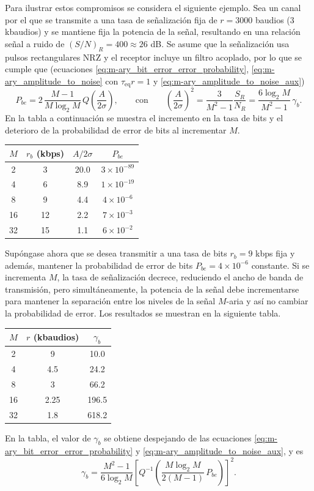 \documentclass[a4paper]{article}
\begin{document}
Para ilustrar estos compromisos se considera el siguiente ejemplo. Sea un canal por el que se transmite a una tasa de señalización fija de \(r=3000\) baudios (3 kbaudios) y se mantiene fija la potencia de la señal, resultando en una relación señal a ruido de \((S/N)_R=400\approx26\) dB. Se asume que la señalización usa pulsos rectangulares NRZ y el receptor incluye un filtro acoplado, por lo que se cumple que (ecuaciones \ref{eq:m-ary_bit_error_error_probability}, \ref{eq:m-ary_amplitude_to_noise} con \(\tau_\textrm{eq}r=1\) y \ref{eq:m-ary_amplitude_to_noise_aux})
\[
 P_{be}=2\,\frac{M-1}{M\log_2M}\,Q\left(\frac{A}{2\sigma}\right),\qquad\textrm{con}\qquad \left(\frac{A}{2\sigma}\right)^2=\frac{3}{M^2-1}\frac{S_R}{N_R}=\frac{6\log_2M}{M^2-1}\,\gamma_b.
\]
En la tabla a continuación se muestra el incremento en la tasa de bits y el deterioro de la probabilidad de error de bits al incrementar \(M\).
\begin{center}
\bgroup
\def\arraystretch{1.2}
\begin{tabular}{c c S c}\hline
\boldmath\(M\) & \boldmath\(r_b\) (kbps) & \boldmath\(A/2\sigma\) & \boldmath\(P_{be}\) \\ & 3  &  20.0 & \(3\times10^{-89}\) \\
4 & 6  &  8.9 & \(1\times10^{-19}\) \\
8 & 9  &  4.4 & \(4\times10^{-6}\) \\
16 & 12  &  2.2 & \(7\times10^{-3}\) \\
32 & 15  &  1.1 & \(6\times10^{-2}\)\\\hline
\end{tabular}
\egroup
\end{center}

Supóngase ahora que se desea transmitir a una tasa de bits \(r_b=9\) kbps fija y además, mantener la probabilidad de error de bits \(P_{be}=4\times10^{-6}\) constante. Si se incrementa \(M\), la tasa de señalización decrece, reduciendo el ancho de banda de transmisión, pero simultáneamente, la potencia de la señal debe incrementarse para mantener la separación entre los niveles de la señal \(M\)-aria y así no cambiar la probabilidad de error. Los resultados se muestran en la siguiente tabla.
\begin{center}
\bgroup
\def\arraystretch{1.2}
\begin{tabular}{c S S}\hline
\boldmath\(M\) & \boldmath\(r\) (kbaudios) & \boldmath\(\gamma_b\) \\ & 9  &  10.0  \\
4 & 4.5  &  24.2  \\
8 & 3  &  66.2  \\
16 & 2.25  &  196.5  \\
32 & 1.8  &  618.2 \\\hline
\end{tabular}
\egroup
\end{center}
En la tabla, el valor de \(\gamma_b\) se obtiene despejando de las ecuaciones \ref{eq:m-ary_bit_error_error_probability} y \ref{eq:m-ary_amplitude_to_noise_aux}, y es
\[
 \gamma_b = \frac{M^2-1}{6\log_2M}\left[Q^{-1}\left(\frac{M\log_2M}{2\left(M-1\right)}\,P_{be}\right)\right]^2.
\]
\end{document}
